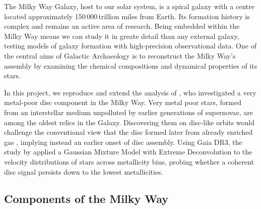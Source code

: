 \documentclass[a4paper,12pt]{article}
\begin{document}
The Milky Way Galaxy, host to our solar system, is a spiral galaxy with a centre 
located approximately 150\,000\,trillion miles from Earth. 
Its formation history is complex and remains an active area of research. Being embedded 
within the Milky Way means we can study it in greate detail than any external galaxy, 
testing models of galaxy formation with high-precision observational data. One of the 
central aims of Galactic Archaeology is to reconstruct the Milky Way’s assembly by 
examining the chemical compositions and dynamical properties of its stars.

In this project, we reproduce and extend the analysis of \citet{zhang2024existencemetalpoordiscmilky}, 
who investigated a very metal-poor disc component in the Milky Way. Very metal poor 
stars, formed from an interstellar medium unpolluted by earlier generations of 
supernovae, are among the oldest relics in the Galaxy. Discovering them on disc-like 
orbits would challenge the conventional view that the disc formed later from already 
enriched gas \citep{BlandHawthorn2016}, implying instead an earlier onset of disc 
assembly. Using Gaia DR3, the study by \citet{zhang2024existencemetalpoordiscmilky} 
applied a Gaussian Mixture Model with Extreme Deconvolution to the velocity 
distributions of stars across metallicity bins, probing whether a coherent disc signal 
persists down to the lowest metallicities.

\subsection{Components of the Milky Way}
\end{document}
